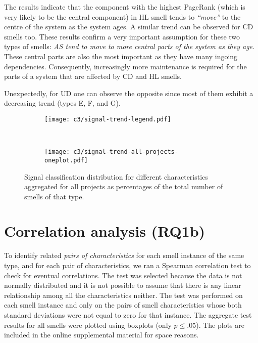 The results indicate that the component with the highest PageRank (which is very likely to be the central component) in HL smell tends to \emph{``move''} to the centre of the system as the system ages. A similar trend can be observed for CD smells too.
These results confirm a very important assumption for these two types of smells: \emph{AS tend to move to more central parts of the system as they age}. These central parts are also the most important as they have many ingoing dependencies. Consequently, increasingly more maintenance is required for the parts of a system that are affected by CD and HL smells. 

Unexpectedly, for UD one can observe the opposite since most of them exhibit a decreasing trend (types E, F, and G).

\vspace{1mm}

\begin{figure}[t]
    \centering
    \begin{subfigure}[]{.8\textwidth}
        \centering
        \texttt{[image: c3/signal-trend-legend.pdf]}
    \end{subfigure}
	\hfill \\
    \begin{subfigure}[]{.8\textwidth}
        \centering
        \texttt{[image: c3/signal-trend-all-projects-oneplot.pdf]}
    \end{subfigure}
    \caption{Signal classification distribution for different characteristics aggregated for all projects as percentages of the total number of smells of that type.} 
    \label{c3:fig:signal-all}
\end{figure}

\section{Correlation analysis (RQ1b)}\label{c3:sec:rq1b-results}
To identify related \textit{pairs of characteristics} for each smell instance of the same type, and for each pair of characteristics, we ran a Spearman correlation test to check for eventual correlations. 
The test was selected because the data is not normally distributed and it is not possible to assume that there is any linear relationship among all the characteristics neither.
The test was performed on each smell instance and only on the pairs of smell characteristics whose both standard deviations were not equal to zero for that instance.
The aggregate test results for all smells were plotted using boxplots (only $p \leq .05$).
The plots are included in the online supplemental material for space reasons.

